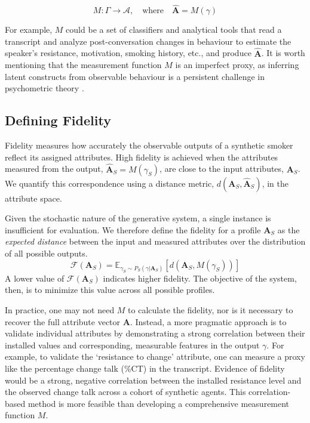 $$M: \Gamma \rightarrow \mathcal{A}, \quad \text{where} \quad \hat{\textbf{A}} = M(\gamma)$$

For example, $M$ could be a set of classifiers and analytical tools that read a transcript and analyze post-conversation changes in behaviour to estimate the speaker's resistance, motivation, smoking history, etc., and produce  $\hat{\textbf{A}}$. It is worth mentioning that the measurement function $M$ is an imperfect proxy, as inferring latent constructs from observable behaviour is a persistent challenge in psychometric theory \cite{loevinger1957objective, borsboom2004concept}.

\subsection{Defining Fidelity}

Fidelity measures how accurately the observable outputs of a synthetic smoker reflect its assigned attributes. High fidelity is achieved when the attributes measured from the output, $\hat{\textbf{A}}_S = M(\gamma_S)$, are close to the input attributes, $\textbf{A}_S$. We quantify this correspondence using a distance metric, $d(\textbf{A}_S, \hat{\textbf{A}}_S)$, in the attribute space.

Given the stochastic nature of the generative system, a single instance is insufficient for evaluation. We therefore define the fidelity for a profile $\textbf{A}_S$ as the \emph{expected distance} between the input and measured attributes over the distribution of all possible outputs.
$$\mathcal{F}(\textbf{A}_S) = \mathbb{E}_{\gamma_S \sim P_S(\gamma | \textbf{A}_S)}[d(\textbf{A}_S, M(\gamma_S))]$$
A lower value of $\mathcal{F}(\textbf{A}_S)$ indicates higher fidelity. The objective of the system, then, is to minimize this value across all possible profiles.

In practice, one may not need $M$ to calculate the fidelity, nor is it necessary to recover the full attribute vector $\textbf{A}$. Instead, a more pragmatic approach is to validate individual attributes by demonstrating a strong correlation between their installed values and corresponding, measurable features in the output $\gamma$. For example, to validate the `resistance to change' attribute, one can measure a proxy like the percentage change talk (\%CT) in the transcript. Evidence of fidelity would be a strong, negative correlation between the installed resistance level and the observed change talk across a cohort of synthetic agents. This correlation-based method is more feasible than developing a comprehensive measurement function $M$.

